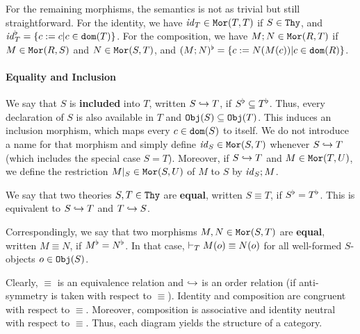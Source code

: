 For the remaining morphisms, the semantics is not as trivial but still straightforward.
For the identity, we have $\mathit{id}_{T}\in\mathtt{Mor}(T,T)$ if $S\in\mathtt{Thy}$, and $\mathit{id}_{T}^\flat=\{c:=c|c\in\mathtt{dom}(T)\}$.
For the composition, we have $M;N\in\mathtt{Mor}(R,T)$ if $M\in\mathtt{Mor}(R,S)$ and $N\in\mathtt{Mor}(S,T)$, and $(M;N)^\flat=\{c:=N(M(c))|c\in\mathtt{dom}(R)\}$.

\paragraph{Equality and Inclusion}
We say that $S$ is \textbf{included} into $T$, written $S\hookrightarrow T$, if $S^\flat\subseteq T^\flat$.
Thus, every declaration of $S$ is also available in $T$ and $\mathtt{Obj}(S)\subseteq\mathtt{Obj}(T)$.
This induces an inclusion morphism, which maps every $c\in\mathtt{dom}(S)$ to itself.
We do not introduce a name for that morphism and simply define $\mathit{id}_{S}\in\mathtt{Mor}(S,T)$ whenever $S\hookrightarrow T$ (which includes the special case $S=T$).
Moreover, if $S\hookrightarrow T$ and $M\in\mathtt{Mor}(T,U)$, we define the restriction $M|_S\in\mathtt{Mor}(S,U)$ of $M$ to $S$ by $\mathit{id}_{S};M$.

We say that two theories $S,T\in\mathtt{Thy}$ are \textbf{equal}, written $S\equiv T$, if $S^\flat=T^\flat$.
This is equivalent to $S\hookrightarrow T$ and $T\hookrightarrow S$.

Correspondingly, we say that two morphisms $M,N\in\mathtt{Mor}(S,T)$ are \textbf{equal}, written $M\equiv N$, if $M^\flat=N^\flat$.
In that case, $\vdash_T M(o)\equiv N(o)$ for all well-formed $S$-objects $o\in\mathtt{Obj}(S)$.

Clearly, $\equiv$ is an equivalence relation and $\hookrightarrow$ is an order relation (if anti-symmetry is taken with respect to $\equiv$).
Identity and composition are congruent with respect to $\equiv$.
Moreover, composition is associative and identity neutral with respect to $\equiv$.
Thus, each diagram yields the structure of a category.

